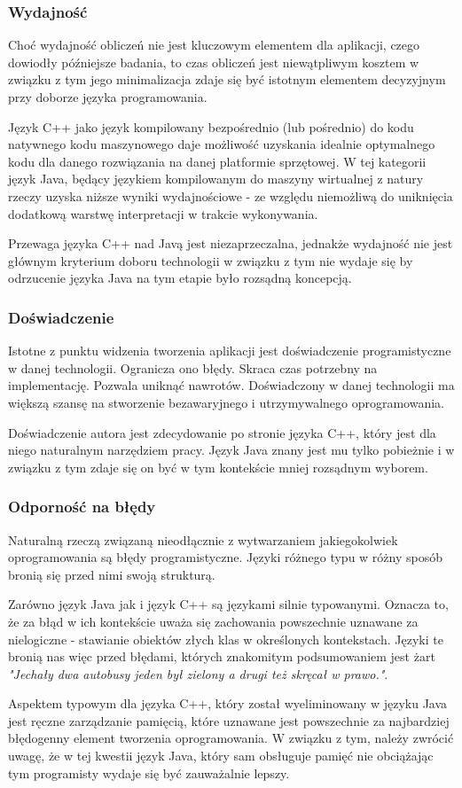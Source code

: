 {\subsubsection{Wydajność}
\par{
Choć wydajność obliczeń nie jest kluczowym elementem dla aplikacji, czego dowiodły późniejsze badania, to czas obliczeń jest niewątpliwym kosztem w związku z tym jego minimalizacja zdaje się być istotnym elementem decyzyjnym przy doborze języka programowania.
}
\par{
Język C++ jako język kompilowany bezpośrednio (lub pośrednio) do kodu natywnego kodu maszynowego daje możliwość uzyskania idealnie optymalnego kodu dla danego rozwiązania na danej platformie sprzętowej. W tej kategorii język Java, będący językiem kompilowanym do maszyny wirtualnej z natury rzeczy uzyska niższe wyniki wydajnościowe - ze względu niemożliwą do uniknięcia dodatkową warstwę interpretacji w trakcie wykonywania.
}
\par{
Przewaga języka C++ nad Javą jest niezaprzeczalna, jednakże wydajność nie jest głównym kryterium doboru technologii w związku z tym nie wydaje się by odrzucenie języka Java na tym etapie było rozsądną koncepcją.
}
\subsubsection{Doświadczenie}
\par{
Istotne z punktu widzenia tworzenia aplikacji jest doświadczenie programistyczne w danej technologii. Ogranicza ono błędy. Skraca czas potrzebny na implementację. Pozwala uniknąć nawrotów. Doświadczony w danej technologii ma większą szansę na stworzenie bezawaryjnego i utrzymywalnego oprogramowania.
}
\par{
Doświadczenie autora jest zdecydowanie po stronie języka C++, który jest dla niego naturalnym narzędziem pracy. Język Java znany jest mu tylko pobieżnie i w związku z tym zdaje się on być w tym kontekście mniej rozsądnym wyborem.
}
\subsubsection{Odporność na błędy}
\par{
Naturalną rzeczą związaną nieodłącznie z wytwarzaniem jakiegokolwiek oprogramowania są błędy programistyczne. Języki różnego typu w różny sposób bronią się przed nimi swoją strukturą.
}
\par{
Zarówno język Java jak i język C++ są językami silnie typowanymi. Oznacza to, że za błąd w ich kontekście uważa się zachowania powszechnie uznawane za nielogiczne - stawianie obiektów złych klas w określonych kontekstach. Języki te bronią nas więc przed błędami, których znakomitym podsumowaniem jest żart \textit{"Jechały dwa autobusy jeden był zielony a drugi też skręcał w prawo."}.
}
\par{
Aspektem typowym dla języka C++, który został wyeliminowany w języku Java jest ręczne zarządzanie pamięcią, które uznawane jest powszechnie za najbardziej błędogenny element tworzenia oprogramowania. W związku z tym, należy zwrócić uwagę, że w tej kwestii język Java, który sam obsługuje pamięć nie obciążając tym programisty wydaje się być zauważalnie lepszy.
}
}
